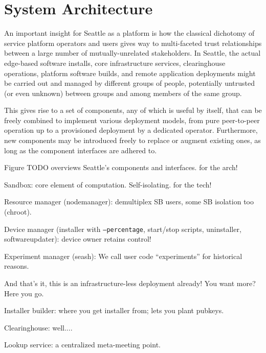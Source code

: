 \section{System Architecture}

An important insight for Seattle as a platform is how the classical
dichotomy of service platform operators and users gives way to multi-faceted
trust relationships between a large number of mutually-unrelated
stakeholders.
In Seattle, the actual edge-based software installs, core infrastructure
services, clearinghouse operations, platform software builds, and remote
application deployments might be carried out and managed by different
groups of people, potentially untrusted (or even unknown) between groups
and among members of the same group.

This gives rise to a set of components, any of which is useful
by itself, that can be freely combined to implement various
deployment models, from pure peer-to-peer operation up to a
provisioned deployment by a dedicated operator. Furthermore,
new components may be introduced freely to replace or augment
existing ones, as long as the component interfaces are adhered to.


Figure TODO overviews Seattle's components and interfaces.
\cite{Cappos2009} for the arch!

Sandbox: core element of computation. Self-isolating.
\cite{RepySandbox,li2015fence} for the tech!

Resource manager (nodemanager): demultiplex SB users, some SB isolation too (chroot).

Device manager (installer with \texttt{--percentage}, start/stop scripts, uninstaller, softwareupdater): device owner retains control!

Experiment manager (seash): We call user code ``experiments'' for historical reasons.

And that's it, this is an infrastructure-less deployment already!
You want more? Here you go.

Installer builder: where you get installer from; lets you plant pubkeys.

Clearinghouse: well....

Lookup service: a centralized meta-meeting point.



